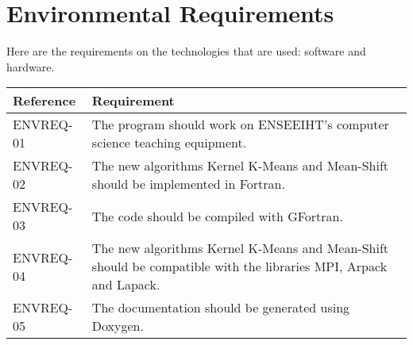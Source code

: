 \section{Environmental Requirements}
Here are the requirements on the technologies that are used: software and hardware.
\begin{flushleft}
    \begin{tabular}{ | p{} |  p{} |}
    \hline
   	\textbf{Reference} & \textbf{Requirement}
    \\
    \hline
	ENVREQ-01 & The program should work on ENSEEIHT's computer science teaching equipment.
	\\
	\hline
    ENVREQ-02 & The new algorithms Kernel K-Means and Mean-Shift should be implemented in Fortran.
    \\
    \hline
    ENVREQ-03 & The code should be compiled with GFortran.
	\\
    \hline
    ENVREQ-04 & The new algorithms Kernel K-Means and Mean-Shift should be compatible with the libraries MPI, Arpack and Lapack.
    \\
    \hline
    ENVREQ-05 & The documentation should be generated using Doxygen.
    \\
    \hline
    \end{tabular}
\end{flushleft}
